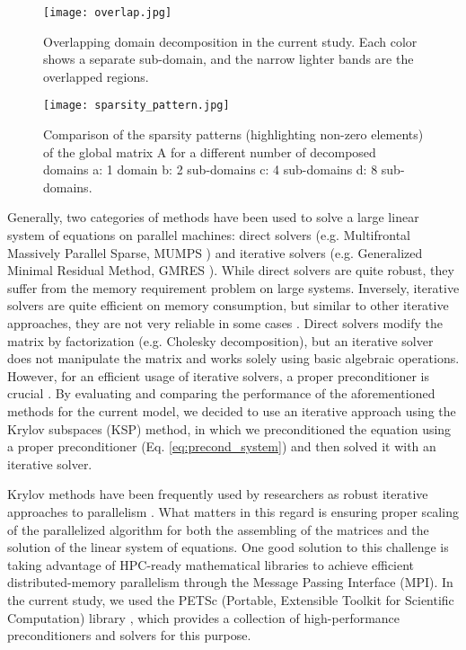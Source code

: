 \begin{figure}[h]
\centering
\medskip
\texttt{[image: overlap.jpg]}
\caption[Overlapping domain decomposition ]{Overlapping domain decomposition in the current study. Each color shows a separate sub-domain, and the narrow lighter bands are the overlapped regions.} \label{fig:overlap}
\end{figure}


\begin{figure}[h]
\centering
\medskip
\texttt{[image: sparsity\_pattern.jpg]}
\caption[Comparison of the sparsity patterns of the global matrix A]{Comparison of the sparsity patterns (highlighting non-zero elements) of the global matrix A for a different number of decomposed domains a: 1 domain b: 2 sub-domains c: 4 sub-domains d: 8 sub-domains.} \label{fig:sparsity_pattern}
\end{figure}


Generally, two categories of methods have been used to solve a large linear system of equations on parallel machines: direct solvers (e.g. Multifrontal Massively Parallel Sparse, MUMPS \cite{MUMPS1}) and iterative solvers (e.g. Generalized Minimal Residual Method, \gls{GMRES} \cite{Saad1986}). While direct solvers are quite robust, they suffer from the memory requirement problem on large systems. Inversely, iterative solvers are quite efficient on memory consumption, but similar to other iterative approaches, they are not very reliable in some cases \cite{Saad2003}. Direct solvers modify the matrix by factorization (e.g. Cholesky decomposition), but an iterative solver does not manipulate the matrix and works solely using basic algebraic operations. However, for an efficient usage of iterative solvers, a proper preconditioner is crucial \cite{Saad2003}. By evaluating and comparing the performance of the aforementioned methods for the current model, we decided to use an iterative approach using the Krylov subspaces (\gls{KSP}) method, in which we preconditioned the equation using a proper preconditioner (Eq. \ref{eq:precond_system}) and then solved it with an iterative solver.


Krylov methods have been frequently used by researchers as robust iterative approaches to parallelism \cite{Ipsen1998}. What matters in this regard is ensuring proper scaling of the parallelized algorithm for both the assembling of the matrices and the solution of the linear system of equations. One good solution to this challenge is taking advantage of \gls{HPC}-ready mathematical libraries to achieve efficient distributed-memory parallelism through the Message Passing Interface (\gls{MPI}). In the current study, we used the \gls{PETSc} (Portable, Extensible Toolkit for Scientific Computation) library \cite{petsc}, which provides a collection of high-performance preconditioners and solvers for this purpose.

